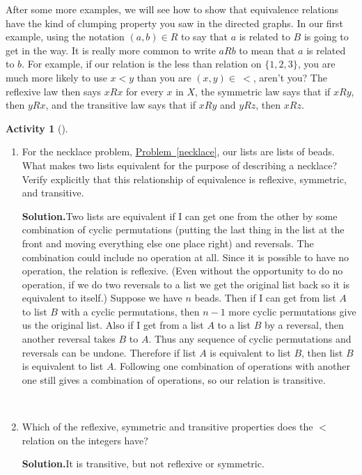 \documentclass[10pt,]{book}
\theoremstyle{plain}
\theoremstyle{definition}
\newtheorem{activity}[project]{Activity}
\numberwithin{equation}{chapter}
\newcommand{\lt}{<}
\begin{document}
\par
After some more examples, we will see how to show that equivalence relations have the kind of clumping property you saw in the directed graphs. In our first example, using the notation \((a,b) \in R\) to say that \(a\) is related to \(B\) is going to get in the way. It is really more common to write \(a
R b\) to mean that \(a\) is related to \(b\). For example, if our relation is the less than relation on \(\{1,2,3\}\), you are much more likely to use \(x\lt y\) than you are \((x,y)\in \ \lt\), aren't you? The reflexive law then says \(xRx\) for every \(x\) in \(X\), the symmetric law says that if \(xRy\), then \(yRx\), and the transitive law says that if \(xRy\) and \(yRz\), then \(xRz\).%
\begin{activity}[]\label{nchoosekanotherway}
~\par
\begin{enumerate}[label=(\alph*)]
 \item For the necklace problem, \hyperref[necklace]{Problem~\ref{necklace}}, our lists are lists of beads. What makes two lists equivalent for the purpose of describing a necklace? Verify explicitly that this relationship of equivalence is reflexive, symmetric, and transitive.%
\par\medskip\noindent%
\textbf{Solution.}\quad Two lists are equivalent if I can get one from the other by some combination of cyclic permutations (putting the last thing in the list at the front and moving everything else one place right) and reversals. The combination could include no operation at all. Since it is possible to have no operation, the relation is reflexive. (Even without the opportunity to do no operation, if we do two reversals to a list we get the original list back so it is equivalent to itself.) Suppose we have \(n\) beads. Then if I can get from list \(A\) to list \(B\) with a cyclic permutations, then \(n-1\) more cyclic permutations give us the original list. Also if I get from a list \(A\) to a list \(B\) by a reversal, then another reversal takes \(B\) to \(A\). Thus any sequence of cyclic permutations and reversals can be undone. Therefore if list \(A\) is equivalent to list \(B\), then list \(B\) is equivalent to list \(A\). Following one combination of operations with another one still gives a combination of operations, so our relation is transitive.%

~\par
\item Which of the reflexive, symmetric and transitive properties does the \(\lt\) relation on the integers have?%
\par\medskip\noindent%
\textbf{Solution.}\quad It is transitive, but not reflexive or symmetric.%


\end{enumerate}
\end{activity}
\end{document}

